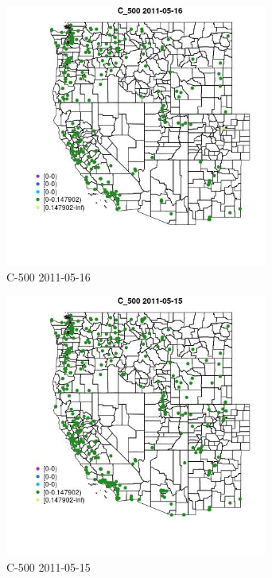 \begin{figure} 
\centering  
\includegraphics[width=0.77\textwidth]{Code_Outputs/ML_input_report_ML_input_PM25_Step5_part_d_de_duplicated_aves_ML_input_MapObsC_5002011-05-16.jpg} 
\caption{\label{fig:ML_input_report_ML_input_PM25_Step5_part_d_de_duplicated_aves_ML_inputMapObsC_5002011-05-16}C-500 2011-05-16} 
\end{figure} 
 

\begin{figure} 
\centering  
\includegraphics[width=0.77\textwidth]{Code_Outputs/ML_input_report_ML_input_PM25_Step5_part_d_de_duplicated_aves_ML_input_MapObsC_5002011-05-15.jpg} 
\caption{\label{fig:ML_input_report_ML_input_PM25_Step5_part_d_de_duplicated_aves_ML_inputMapObsC_5002011-05-15}C-500 2011-05-15} 
\end{figure} 
 

